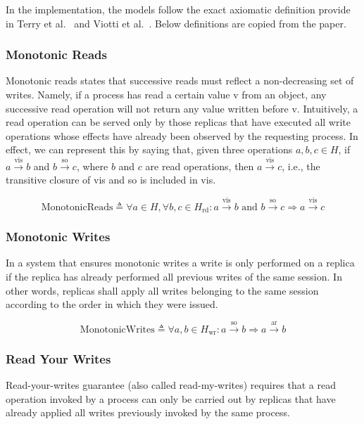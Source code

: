 In the implementation, the models follow the exact axiomatic definition provide
in Terry et al.~\cite{terry1994session} and Viotti et
al.~\cite{viotti2016consistency}.
Below definitions are copied from the paper.

\subsubsection{Monotonic Reads}

Monotonic reads states that successive reads must reflect a non-decreasing set
of writes. Namely, if a process has read a certain value v from an object, any
successive read operation will not return any value written before v.
Intuitively, a read operation can be served only by those replicas that have
executed all write operations whose effects have already been observed by the
requesting process. In effect, we can represent this by saying that, given three
operations $a, b, c \in H$, if $a \xrightarrow{\text{vis}} b$ and
$b \xrightarrow{\text{so}} c$, where $b$ and $c$ are read operations, then
$a \xrightarrow{\text{vis}} c$, i.e., the transitive closure of vis
and so is included
in vis.

$$
\text{MonotonicReads} \triangleq \forall a \in H, \forall b, c \in
H_\text{rd}: a \xrightarrow{\text{vis}} b \text{ and } b
\xrightarrow{\text{so}} c \Rightarrow a \xrightarrow{\text{vis}} c
$$

\subsubsection{Monotonic Writes}

In a system that ensures monotonic writes a write is only performed on a replica
if the replica has already performed all previous writes of the same session. In
other words, replicas shall apply all writes belonging to the same session
according to the order in which they were issued.

$$
\text{MonotonicWrites} \triangleq \forall a, b \in H_\text{wr}: a
\xrightarrow{\text{so}} b \Rightarrow a \xrightarrow{\text{ar}} b
$$

\subsubsection{Read Your Writes}

Read-your-writes guarantee (also called read-my-writes) requires that a read
operation invoked by a process can only be carried out by replicas that have
already applied all writes previously invoked by the same process.

